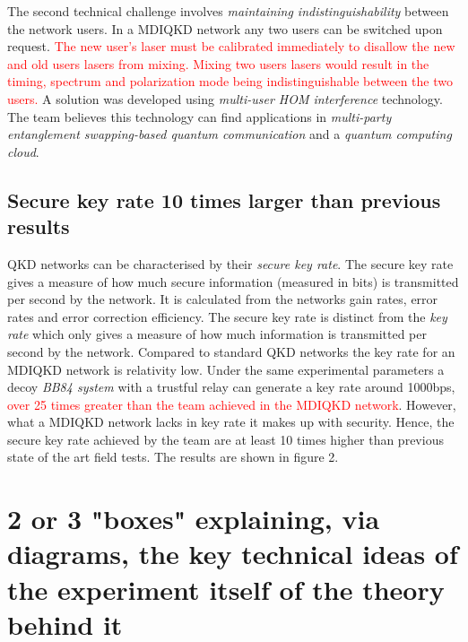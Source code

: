 \documentclass[journal]{vgtc}
\begin{document}
The second technical challenge involves \textit{maintaining indistinguishability} between the network users. In a MDIQKD network any two users can be switched upon request. \textcolor{red}{ The new user's laser must be calibrated immediately to disallow the new and old users lasers from mixing. Mixing two users lasers would result in the timing, spectrum and polarization mode being indistinguishable between the two users.} A solution was developed using \textit{multi-user HOM interference} technology. The team believes this technology can find applications in \textit{multi-party entanglement swapping-based quantum communication} and a \textit{quantum computing cloud}.

\subsection*{Secure key rate 10 times larger than previous results}

QKD networks can be characterised by their \textit{secure key rate}.  The secure key rate gives a measure of how much secure information (measured in bits) is transmitted per second by the network. It is calculated from the networks gain rates, error rates and error correction efficiency. The secure key rate is distinct from the \textit{key rate} which only gives a measure of how much information is transmitted per second by the network. Compared to standard QKD networks the key rate for an MDIQKD network is relativity low. Under the same experimental parameters a decoy \textit{BB84 system} with a trustful relay can generate a key rate around 1000bps, \textcolor{red}{over 25 times greater than the team achieved in the MDIQKD network}. However, what a MDIQKD network lacks in key rate it makes up with security. Hence, the secure key rate achieved by the team are at least 10 times higher than previous state of the art field tests. The results are shown in figure 2.


\section{2 or 3 "boxes" explaining, via diagrams, the key technical ideas of the experiment itself of the theory behind it}
\end{document}
